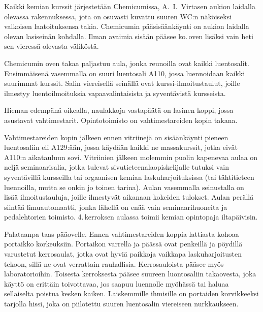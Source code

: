 \documentclass[../ala_hataile.tex]{subfiles}
\begin{document}
	\clearpage
	
	Kaikki kemian kurssit järjestetään Chemicumissa,
	A.~I.~Virtasen aukion laidalla
	olevassa rakennuksessa, jota on osuvasti
	kuvattu suuren WC:n näköiseksi valkoisen
	laatoituksensa takia. Chemicumin pääsisäänkäynti
	on aukion laidalla olevan lasiseinän
	kohdalla. Ilman avaimia
	sisään pääsee ko.\,oven lisäksi vain heti sen
	vieressä olevasta väliköstä.
	
	Chemicumin oven takaa paljastuu aula,
	jonka reunoilla ovat kaikki luentosalit. Ensimmäisenä
	vasemmalla on suuri luentosali
	A110, jossa luennoidaan kaikki suurimmat
	kurssit. Salin viereisellä seinällä ovat
	kurssi-ilmoitustaulut, joille ilmestyy luentoilmoituksia
	vapaavalintaisista ja syventävistä
	kursseista.
	
	Hieman edempänä oikealla, naulakkoja
	vastapäätä on lasinen koppi, jossa asustavat vahtimestarit. Opintotoimisto on vahtimestareiden kopin takana.
	
	Vahtimestareiden kopin jälkeen ennen
	vitriinejä on sisäänkäynti pieneen luentosaliin
	eli A129:ään, jossa käydään kaikki
	ne massakurssit, jotka eivät A110:n aikatauluun
	sovi. Vitriinien jälkeen molemmin
	puolin kapenevaa aulaa on neljä seminaarisalia,
	jotka tulevat sivu\-tieteen\-ala\-opiskelijalle
	tutuksi vain syventävillä kursseilla tai orgaanisen
	kemian laskuharjoituksissa (tai
	tähtitieteen luennoilla, mutta se onkin jo
	toinen tarina). Aulan vasemmalla seinustalla
	on lisää ilmoitustauluja, joille ilmestyvät
	aikanaan kokeiden tulokset.
	Aulan perällä siintää limuautomaatti, jonka lähellä on enää vain seminaari\-huoneita ja peda\-lehtorien toimisto. 4.\,kerroksen aulassa toimii kemian opinto\-paja iltapäivisin.
	
	Palataanpa taas pääovelle.
	Ennen vahtimestareiden koppia lattiasta
	kohoaa portaikko korkeuksiin. Portaikon
	varrella ja päässä ovat penkeillä ja pöydillä varustetut kerrosaulat, jotka ovat hyviä
	paikkoja vaikkapa laskuharjoitusten tekoon,
	sillä ne ovat verrattain rauhallisia.
	Kerrosauloista pääsee myös laboratorioihin. Toisesta kerroksesta
	pääsee suureen luontosaliin takaovesta,
	joka käyttö on erittäin toivottavaa, jos saapuu
	luennolle myöhässä tai haluaa sellaiselta
	poistua kesken kaiken. Laiskemmille
	ihmisille on portaiden korvikkeeksi tarjolla
	hissi, joka on piilotettu suuren luentosalin
	viereiseen nurkkaukseen. 
	
\end{document}
